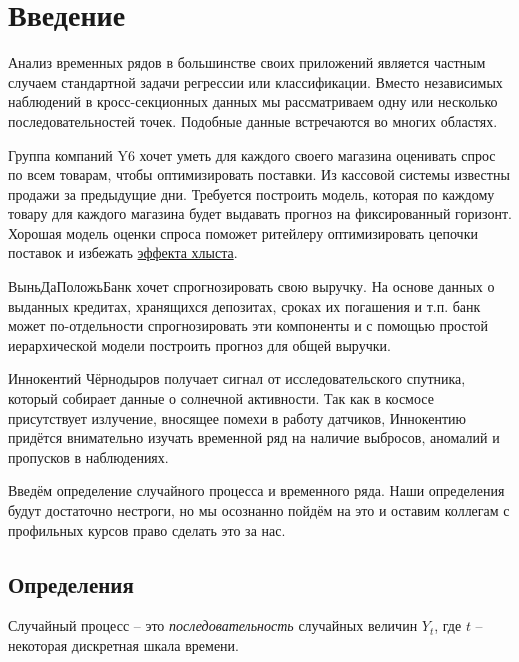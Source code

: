\documentclass[12pt,fleqn]{article}
\begin{document}
	
\chapter{Введение}

Анализ временных рядов в большинстве своих приложений является частным случаем  стандартной задачи регрессии или классификации. Вместо независимых наблюдений в кросс-секционных данных мы рассматриваем одну или несколько последовательностей точек. Подобные данные встречаются во многих областях.
\begin{example}
	Группа компаний Y6 хочет уметь для каждого своего магазина оценивать спрос по всем товарам, чтобы оптимизировать поставки. Из кассовой системы известны продажи за предыдущие дни. Требуется построить модель, которая по каждому товару для каждого магазина будет выдавать прогноз на фиксированный горизонт. Хорошая модель оценки спроса поможет ритейлеру оптимизировать цепочки поставок и избежать \href{https://ardma.ru/marketing/osnovy-marketinga/effekt-khlysta/}{эффекта хлыста}.
\end{example}

\begin{example}
	ВыньДаПоложьБанк хочет спрогнозировать свою выручку. На основе данных о выданных кредитах, хранящихся депозитах, сроках их погашения и т.п. банк может по-отдельности спрогнозировать эти компоненты и с помощью простой иерархической модели построить прогноз для общей выручки.
\end{example}

\begin{example}
	Иннокентий Чёрнодыров получает сигнал от исследовательского спутника, который собирает данные о солнечной активности. Так как в космосе присутствует излучение, вносящее помехи в работу датчиков, Иннокентию придётся внимательно изучать временной ряд на наличие выбросов, аномалий и пропусков в наблюдениях.
\end{example}


Введём определение случайного процесса и временного ряда.  Наши определения будут достаточно нестроги, но мы осознанно пойдём на это и оставим коллегам с профильных курсов право сделать это за нас.

\section{Определения}

\begin{definition}
	Случайный процесс -- это \emph{последовательность} случайных величин $Y_t$, где $t$ -- некоторая дискретная шкала времени. 
\end{definition}
\end{document}
